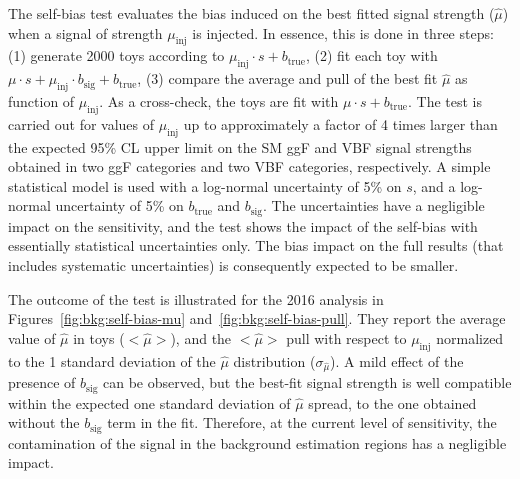 The self-bias test evaluates the bias induced on the best fitted signal strength ($\hat{\mu}$) when a signal of strength $\mu_\text{inj}$ is injected. In essence, this is done in three steps: (1) generate 2000 toys according to $\mu_\text{inj} \cdot s + b_\text{true}$, (2) fit each toy with $\mu \cdot s + \mu_\text{inj} \cdot b_\text{sig} + b_\text{true}$, (3) compare the average and pull of the best fit $\hat{\mu}$ as function of $\mu_\text{inj}$. As a cross-check, the toys are fit with $\mu \cdot s + b_\text{true}$. The test is carried out for values of $\mu_\text{inj}$ up to approximately a factor of 4 times larger than the expected 95\% CL upper limit on the SM ggF and VBF signal strengths obtained in two ggF categories and two VBF categories, respectively. A simple statistical model is used with a log-normal uncertainty of 5\% on $s$, and a log-normal uncertainty of 5\% on $b_\text{true}$ and $b_\text{sig}$. The uncertainties have a negligible impact on the sensitivity, and the test shows the impact of the self-bias with essentially statistical uncertainties only. The bias impact on the full results (that includes systematic uncertainties) is consequently expected to be smaller.

The outcome of the test is illustrated for the 2016 analysis in Figures~\ref{fig:bkg:self-bias-mu} and~\ref{fig:bkg:self-bias-pull}. They report the average value of $\hat{\mu}$ in toys ($<\hat{\mu}>$), and the $<\hat{\mu}>$ pull with respect to $\mu_\text{inj}$ normalized to the 1 standard deviation of the $\hat{\mu}$ distribution ($\sigma_{\hat{\mu}}$). A mild effect of the presence of $b_\text{sig}$ can be observed, but the best-fit signal strength is well compatible within the expected one standard deviation of $\hat{\mu}$ spread, to the one obtained without the $b_\text{sig}$ term in the fit. Therefore, at the current level of sensitivity, the contamination of the signal in the background estimation regions has a negligible impact.


